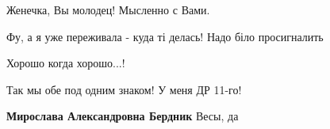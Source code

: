 \begin{itemize}
Женечка, Вы молодец! Мысленно с Вами.


Фу, а я уже переживала - куда ті делась! Надо біло просигналить

Хорошо когда хорошо...!


Так мы обе под одним знаком! У меня ДР 11-го!

\begin{itemize} %
\textbf{Мирослава Александровна Бердник} Весы, да
\end{itemize} %

\end{itemize} %
